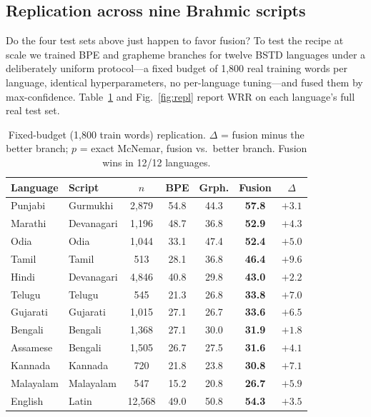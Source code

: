 \documentclass[iicol,pdflatex,sn-mathphys-num]{sn-jnl}
\begin{document}
\subsection{Replication across nine Brahmic scripts}\label{sec:replication}
Do the four test sets above just happen to favor fusion? To test the recipe
at scale we trained BPE and grapheme branches for twelve BSTD languages
under a deliberately uniform protocol---a fixed budget of 1{,}800 real
training words per language, identical hyperparameters, no per-language
tuning---and fused them by max-confidence. Table~\ref{tab:repl} and
Fig.~\ref{fig:repl} report WRR on each language's full real test set.

\begin{table}[t]\centering\small
\caption{Fixed-budget (1{,}800 train words) replication. $\Delta$ = fusion
minus the better branch; $p$ = exact McNemar, fusion vs.\ better branch.
Fusion wins in 12/12 languages.}
\label{tab:repl}
\begin{tabular}{llccccc}
\toprule
Language & Script & $n$ & BPE & Grph. & Fusion & $\Delta$ \\
\midrule
Punjabi   & Gurmukhi   & 2{,}879  & 54.8 & 44.3 & \textbf{57.8} & $+3.1$ \\
Marathi   & Devanagari & 1{,}196  & 48.7 & 36.8 & \textbf{52.9} & $+4.3$ \\
Odia      & Odia       & 1{,}044  & 33.1 & 47.4 & \textbf{52.4} & $+5.0$ \\
Tamil     & Tamil      & 513      & 28.1 & 36.8 & \textbf{46.4} & $+9.6$ \\
Hindi     & Devanagari & 4{,}846  & 40.8 & 29.8 & \textbf{43.0} & $+2.2$ \\
Telugu    & Telugu     & 545      & 21.3 & 26.8 & \textbf{33.8} & $+7.0$ \\
Gujarati  & Gujarati   & 1{,}015  & 27.1 & 26.7 & \textbf{33.6} & $+6.5$ \\
Bengali   & Bengali    & 1{,}368  & 27.1 & 30.0 & \textbf{31.9} & $+1.8$ \\
Assamese  & Bengali    & 1{,}505  & 26.7 & 27.5 & \textbf{31.6} & $+4.1$ \\
Kannada   & Kannada    & 720      & 21.8 & 23.8 & \textbf{30.8} & $+7.1$ \\
Malayalam & Malayalam  & 547      & 15.2 & 20.8 & \textbf{26.7} & $+5.9$ \\
English   & Latin      & 12{,}568 & 49.0 & 50.8 & \textbf{54.3} & $+3.5$ \\
\bottomrule
\end{tabular}
\end{table}
\end{document}
